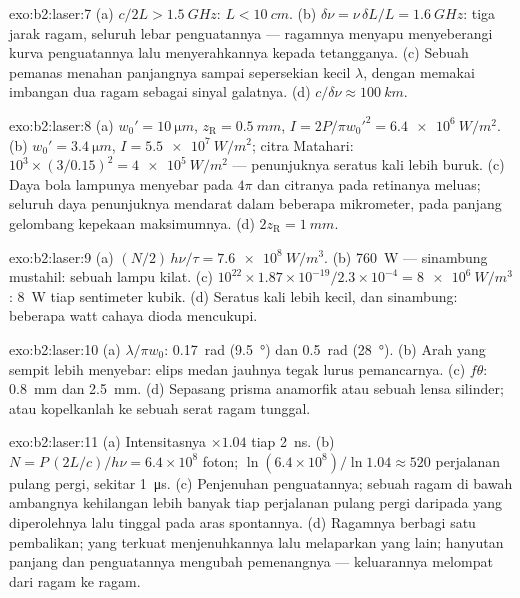 \begin{solution}{exo:b2:laser:7}
(a) $c/2L > \qty{1.5}{GHz}$: $L < \qty{10}{cm}$. (b) $\delta\nu = \nu\,\delta L/L
= \qty{1.6}{GHz}$: tiga jarak ragam, seluruh lebar penguatannya --- ragamnya
menyapu menyeberangi kurva penguatannya lalu menyerahkannya kepada tetangganya. (c) Sebuah
pemanas menahan panjangnya sampai sepersekian kecil $\lambda$, dengan memakai
imbangan dua ragam sebagai sinyal galatnya. (d) $c/\delta\nu \approx
\qty{100}{km}$.
\end{solution}

\begin{solution}{exo:b2:laser:8}
(a) $w_0' = \qty{10}{\micro m}$, $z_{\text{R}} = \qty{0.5}{mm}$, $I = 2P/\pi
w_0'^2 = \qty{6.4e6}{W/m^2}$. (b) $w_0' = \qty{3.4}{\micro m}$, $I =
\qty{5.5e7}{W/m^2}$; citra Matahari: $10^3 \times (3/0.15)^2 =
\qty{4e5}{W/m^2}$ --- penunjuknya seratus kali lebih buruk. (c) Daya bola lampunya
menyebar pada $4\pi$ dan citranya pada retinanya meluas; seluruh daya
penunjuknya mendarat dalam beberapa mikrometer, pada panjang gelombang
kepekaan maksimumnya. (d) $2z_{\text{R}} = \qty{1}{mm}$.
\end{solution}

\begin{solution}{exo:b2:laser:9}
(a) $(N/2)\,h\nu/\tau = \qty{7.6e8}{W/m^3}$. (b) \qty{760}{W} --- sinambung
mustahil: sebuah lampu kilat. (c) $10^{22} \times 1.87 \times
10^{-19}/2.3 \times 10^{-4} = \qty{8e6}{W/m^3}$: \qty{8}{W} tiap sentimeter
kubik. (d) Seratus kali lebih kecil, dan sinambung: beberapa watt cahaya
dioda mencukupi.
\end{solution}

\begin{solution}{exo:b2:laser:10}
(a) $\lambda/\pi w_0$: \qty{0.17}{rad} (\qty{9.5}{\degree}) dan \qty{0.5}{rad}
(\qty{28}{\degree}). (b) Arah yang sempit lebih menyebar:
elips medan jauhnya tegak lurus pemancarnya. (c) $f\theta$:
\qty{0.8}{mm} dan \qty{2.5}{mm}. (d) Sepasang prisma anamorfik atau sebuah
lensa silinder; atau kopelkanlah ke sebuah serat ragam tunggal.
\end{solution}

\begin{solution}{exo:b2:laser:11}
(a) Intensitasnya $\times 1.04$ tiap \qty{2}{ns}. (b) $N = P\,(2L/c)/h\nu =
6.4 \times 10^8$ foton; $\ln(6.4 \times 10^8)/\ln 1.04 \approx 520$ perjalanan
pulang pergi, sekitar \qty{1}{\micro s}. (c) Penjenuhan penguatannya; sebuah ragam di bawah
ambangnya kehilangan lebih banyak tiap perjalanan pulang pergi daripada yang diperolehnya lalu tinggal pada aras
spontannya. (d) Ragamnya berbagi satu pembalikan; yang terkuat
menjenuhkannya lalu melaparkan yang lain; hanyutan panjang dan penguatannya mengubah
pemenangnya --- keluarannya melompat dari ragam ke ragam.
\end{solution}

